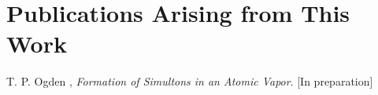 \section{Publications Arising from This Work}
  \label{sec:intro_pubs}

  T. P. Ogden \etal, \textit{Formation of Simultons in an Atomic Vapor}. [In preparation]